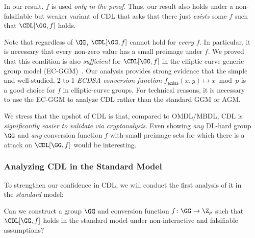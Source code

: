 In our result,  $f$ is used \emph{only in the proof}. Thus, our result also holds under a non-falsifiable but  weaker variant of CDL that asks that there just \emph{exists} some $f$ such that $\CDL[\GG,f]$ holds.  %

 Note that regardless of $\GG$, $\CDL[\GG,f]$ cannot hold for \emph{every} $f$. In particular, it is necessary that every non-zero value has a small preimage under $f$. We proved that this condition is also \emph{sufficient} for $\CDL[\GG,f]$ in the elliptic-curve generic group model (EC-GGM)~\cite{EC:GroSho22}. Our analysis provides strong evidence that the simple and well-studied, 2-to-1 \emph{ECDSA conversion function} $f_\mathsf{ecdsa}(x,y) \mapsto x \bmod p$ is a good choice for $f$ in  elliptic-curve groups.
For technical reasons, it is necessary to use the EC-GGM to analyze CDL rather than the standard GGM or AGM. 

We stress that the  upshot of CDL is that, compared to OMDL/MBDL, CDL is \emph{significantly easier to validate via cryptanalysis}. Even showing \emph{any} DL-hard group $\GG$ and \emph{any} conversion function $f$ with small preimage sets for which there is a attack on $\CDL[\GG,f]$  would be interesting. %


\subsubsection{Analyzing CDL in the Standard Model} \label{sec-cdl-std}

To strengthen our confidence in CDL, we will conduct the first analysis of it in the \emph{standard}  model:
\begin{ques}
    Can we construct a group $\GG$ and conversion function $f \colon \GG \to \Z_p$ such that $\CDL[\GG,f]$ holds in the standard model under non-interactive and falsifiable assumptions? 
\end{ques}


